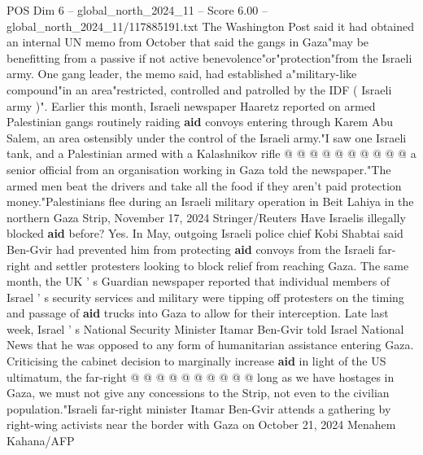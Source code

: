 \begin{textsample}{POS Dim 6 – global\_north\_2024\_11 – Score 6.00 – global\_north\_2024\_11/117885191.txt}
The Washington Post said it had obtained an internal UN memo from October that said the gangs in Gaza"may be benefitting from a passive if not active benevolence"or"protection"from the Israeli army.
One gang leader, the memo said, had established a"military-like compound"in an area"restricted, controlled and patrolled by the IDF ( Israeli army )".
Earlier this month, Israeli newspaper Haaretz reported on armed Palestinian gangs routinely raiding \textbf{aid} convoys entering through Karem Abu Salem, an area ostensibly under the control of the Israeli army."I saw one Israeli tank, and a Palestinian armed with a Kalashnikov rifle @ @ @ @ @ @ @ @ @ @ a senior official from an organisation working in Gaza told the newspaper."The armed men beat the drivers and take all the food if they aren't paid protection money."Palestinians flee during an Israeli military operation in Beit Lahiya in the northern Gaza Strip, November 17, 2024 Stringer/Reuters Have Israelis illegally blocked \textbf{aid} before?
Yes.
In May, outgoing Israeli police chief Kobi Shabtai said Ben-Gvir had prevented him from protecting \textbf{aid} convoys from the Israeli far-right and settler protesters looking to block relief from reaching Gaza.
The same month, the UK ' s Guardian newspaper reported that individual members of Israel ' s security services and military were tipping off protesters on the timing and passage of \textbf{aid} trucks into Gaza to allow for their interception.
Late last week, Israel ' s National Security Minister Itamar Ben-Gvir told Israel National News that he was opposed to any form of humanitarian assistance entering Gaza.
Criticising the cabinet decision to marginally increase \textbf{aid} in light of the US ultimatum, the far-right @ @ @ @ @ @ @ @ @ @ long as we have hostages in Gaza, we must not give any concessions to the Strip, not even to the civilian population."Israeli far-right minister Itamar Ben-Gvir attends a gathering by right-wing activists near the border with Gaza on October 21, 2024 Menahem Kahana/AFP

\end{textsample}
